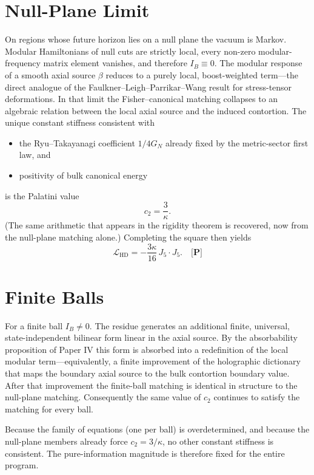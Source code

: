 \documentclass[11pt]{article}
\newcommand{\pP}{\textbf{[P]}}
\begin{document}
\section{Null-Plane Limit}
On regions whose future horizon lies on a null plane the vacuum is
Markov. Modular Hamiltonians of null cuts are strictly local, every
non-zero modular-frequency matrix element vanishes, and therefore
$I_B\equiv 0$. The modular response of a smooth axial source $\beta$
reduces to a purely local, boost-weighted term---the direct analogue of
the Faulkner--Leigh--Parrikar--Wang result for stress-tensor
deformations. In that limit the Fisher--canonical matching collapses to
an algebraic relation between the local axial source and the induced
contortion. The unique constant stiffness consistent with
\begin{itemize}[leftmargin=1.4em]
\item the Ryu--Takayanagi coefficient $1/4G_N$ already fixed by the
metric-sector first law, and
\item positivity of bulk canonical energy
\end{itemize}
is the Palatini value
\begin{equation}
c_2=\frac{3}{\kappa}.
\end{equation}
(The same arithmetic that appears in the rigidity theorem is recovered,
now from the null-plane matching alone.) Completing the square then
yields
\begin{equation}
\mathcal{L}_{\mathrm{HD}}=-\frac{3\kappa}{16}\,J_5\cdot J_5.\quad\pP{}
\end{equation}

\section{Finite Balls}
For a finite ball $I_B\neq 0$. The residue generates an additional
finite, universal, state-independent bilinear form linear in the axial
source. By the absorbability proposition of Paper IV this form is
absorbed into a redefinition of the local modular term---equivalently,
a finite improvement of the holographic dictionary that maps the
boundary axial source to the bulk contortion boundary value. After that
improvement the finite-ball matching is identical in structure to the
null-plane matching. Consequently the same value of $c_2$ continues to
satisfy the matching for every ball.

Because the family of equations (one per ball) is overdetermined, and
because the null-plane members already force $c_2=3/\kappa$, no other
constant stiffness is consistent. The pure-information magnitude is
therefore fixed for the entire program.
\end{document}
